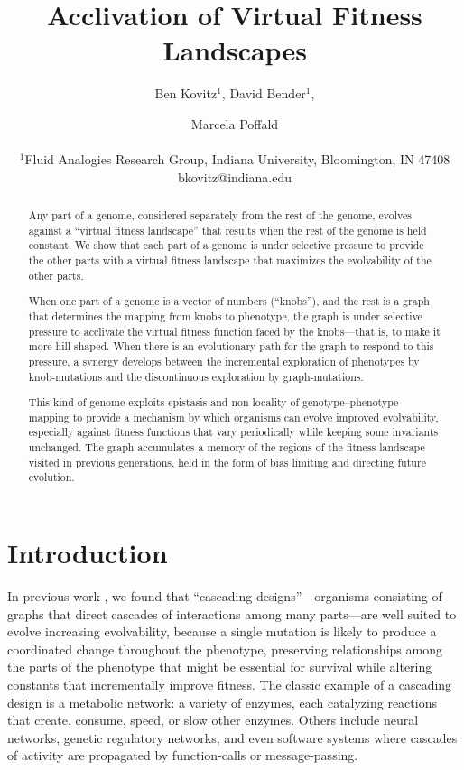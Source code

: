 \documentclass[letterpaper]{article}
\title{Acclivation of Virtual Fitness Landscapes}
\author{Ben Kovitz$^{1}$, David Bender$^{1}$, \and Marcela Poffald \\
\mbox{}\\
$^1$Fluid Analogies Research Group, Indiana University, Bloomington, IN 47408 \\
bkovitz@indiana.edu}
\begin{document}
\maketitle

\begin{abstract}
Any part of a genome, considered separately from the rest of the genome,
evolves against a ``virtual fitness landscape'' that results when the rest of
the genome is held constant. We show that each part of a genome is under
selective pressure to provide the other parts with a virtual fitness landscape
that maximizes the evolvability of the other parts.

When one part of a genome is a vector of numbers (``knobs''), and the rest is a
graph that determines the mapping from knobs to phenotype, the graph is under
selective pressure to acclivate the virtual fitness function faced by the
knobs---that is, to make it more hill-shaped. When there is an evolutionary
path for the graph to respond to this pressure, a synergy develops between the
incremental exploration of phenotypes by knob-mutations and the discontinuous
exploration by graph-mutations.

This kind of genome exploits epistasis and non-locality of genotype--phenotype
mapping to provide a mechanism by which organisms can evolve improved
evolvability, especially against fitness functions that vary periodically while
keeping some invariants unchanged. The graph accumulates a memory of the
regions of the fitness landscape visited in previous generations, held in the
form of bias limiting and directing future evolution.
\end{abstract}

%

\section{Introduction}

In previous work \citep{kovitz2015experiments}, we found that ``cascading
designs''---organisms consisting of graphs that direct cascades of interactions
among many parts---are well suited to evolve increasing evolvability, because
a single mutation is likely to produce a coordinated change throughout the
phenotype, preserving relationships among the parts of the phenotype that might
be essential for survival while altering constants that incrementally improve
fitness. The classic example of a cascading design is a metabolic network: a
variety of enzymes, each catalyzing reactions that create, consume, speed, or
slow other enzymes. Others include neural networks, genetic regulatory
networks, and even software systems where cascades of activity are propagated
by function-calls or message-passing.
\end{document}
